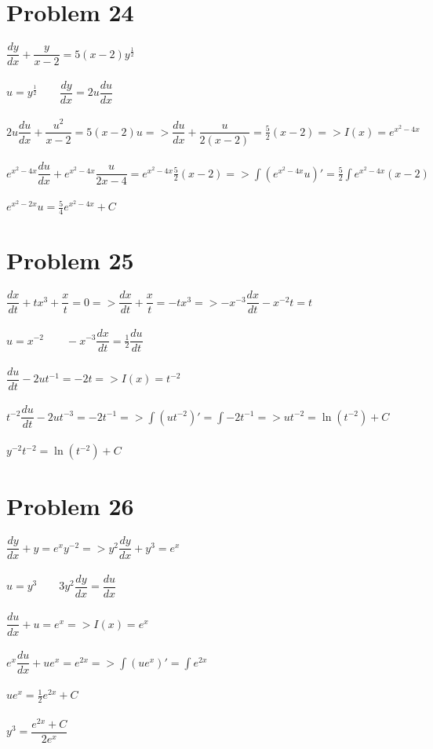 \documentclass[12pt]{exam}
\begin{document}
\section*{Problem 24}
$\dfrac{dy}{dx}+\dfrac{y}{x-2}=5(x-2)y^{\frac{1}{2}}$\\\\
$u=y^\frac{1}{2}\qquad\dfrac{dy}{dx}=2u\dfrac{du}{dx}$\\\\
$2u\dfrac{du}{dx}+\dfrac{u^2}{x-2}=5(x-2)u=>\dfrac{du}{dx}+\dfrac{u}{2(x-2)}=\frac{5}{2}(x-2)=>I(x)=e^{x^2-4x}$\\\\
$e^{x^2-4x}\dfrac{du}{dx}+e^{x^2-4x}\dfrac{u}{2x-4}=e^{x^2-4x}\frac{5}{2}(x-2)=>\int(e^{x^2-4x}u)'=\frac{5}{2}\int e^{x^2-4x}(x-2)$\\\\
$e^{x^2-2x}u=\frac{5}{4}e^{x^2-4x}+C$
\section*{Problem 25}
$\dfrac{dx}{dt}+tx^3+\dfrac{x}{t}=0=>\dfrac{dx}{dt}+\dfrac{x}{t}=-tx^3=>-x^{-3}\dfrac{dx}{dt}-x^{-2}t=t$\\\\
$u=x^{-2}\qquad -x^{-3}\dfrac{dx}{dt}=\frac{1}{2}\dfrac{du}{dt}$\\\\
$\dfrac{du}{dt}-2ut^{-1}=-2t=>I(x)=t^{-2}$\\\\
$t^{-2}\dfrac{du}{dt}-2ut^{-3}=-2t^{-1}=>\int(ut^{-2})'=\int-2t^{-1}=>ut^{-2}=\ln{(t^{-2})}+C$\\\\
$y^{-2}t^{-2}=\ln{(t^{-2})}+C$
\section*{Problem 26}
$\dfrac{dy}{dx}+y=e^xy^{-2}=>y^2\dfrac{dy}{dx}+y^3=e^x$\\\\
$u=y^3\qquad 3y^2\dfrac{dy}{dx}=\dfrac{du}{dx}$\\\\
$\dfrac{du}{dx}+u=e^x=>I(x)=e^x$\\\\
$e^x\dfrac{du}{dx}+ue^x=e^{2x}=>\int(ue^x)'=\int e^{2x}$\\\\
$ue^x=\frac{1}{2}e^{2x}+C$\\\\
$y^3=\dfrac{e^{2x}+C}{2e^x}$
\end{document}
